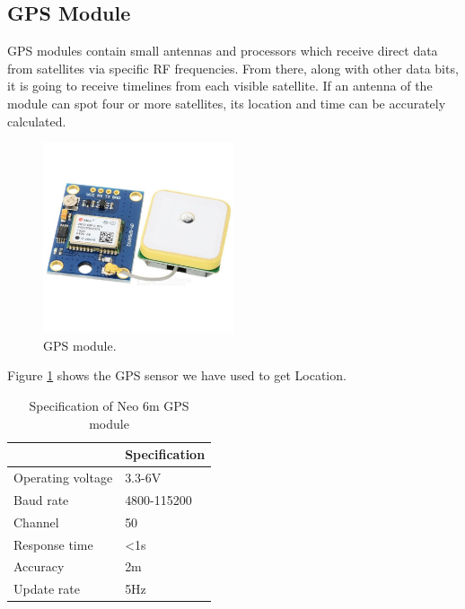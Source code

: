 \subsection{GPS Module}
GPS modules contain small antennas and processors which receive direct data from satellites via specific RF frequencies. From there, along with other data bits, it is going to receive timelines from each visible satellite. If an antenna of the module can spot four or more satellites, its location and time can be accurately calculated.
\begin{figure}[h]
\centering
\includegraphics[width=0.5\textwidth]{figures/neo_6m_gps_module.jpg}
\caption{GPS module.}
\label{GPS1}
\end{figure}
Figure \ref{GPS1} shows the GPS sensor we have used to get Location.

\begin{table}[H]
\centering
\caption{Specification of Neo 6m GPS module}
\begin{tabular}{|l|l|}
\hline
\multicolumn{1}{|c|}{\cellcolor[HTML]{FFFFFF}{\color[HTML]{333333} \textbf{Characteristics}}} & \textbf{Specification} \\ \hline
Operating voltage                                                                       & 3.3-6V                 \\ \hline
Baud rate                                                                               & 4800-115200            \\ \hline
Channel                                                                                 & 50                     \\ \hline
Response time                                                                            & \textless{}1s          \\ \hline
Accuracy                                                                                & 2m                     \\ \hline
Update rate                                                                             & 5Hz                    \\ \hline
\end{tabular}
\end{table}

